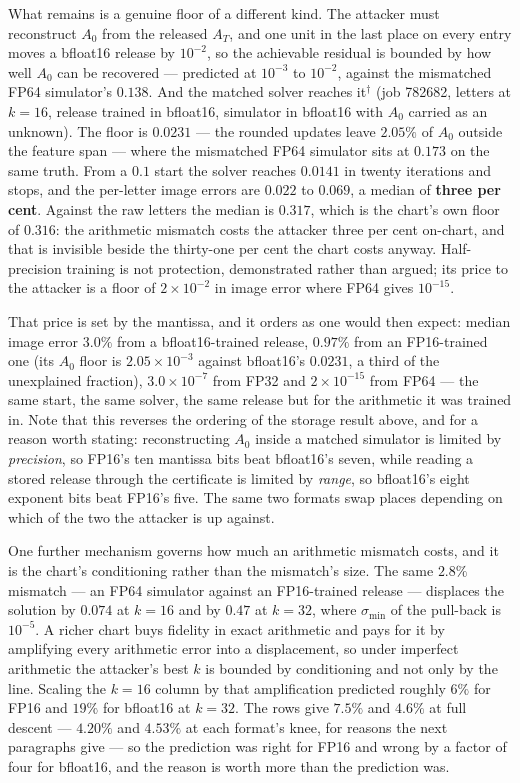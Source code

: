 What remains is a genuine floor of a different kind. The attacker must
reconstruct $A_0$ from the released $A_T$, and one unit in the last place on
every entry moves a bfloat16 release by $10^{-2}$, so the achievable residual
is bounded by how well $A_0$ can be recovered --- predicted at $10^{-3}$ to
$10^{-2}$, against the mismatched FP64 simulator's $0.138$. And the matched solver reaches
it$^\dagger$ (job 782682, letters at $k=16$, release trained in bfloat16,
simulator in bfloat16 with $A_0$ carried as an unknown). The floor is
$0.0231$ --- the rounded updates leave $2.05\%$ of $A_0$ outside the feature
span --- where the mismatched FP64 simulator sits at $0.173$ on the same
truth. From a $0.1$ start the solver reaches $0.0141$ in twenty iterations and
stops, and the per-letter image errors are $0.022$ to $0.069$, a median of
\textbf{three per cent}. Against the raw letters the median is $0.317$, which
is the chart's own floor of $0.316$: the arithmetic mismatch costs the
attacker three per cent on-chart, and that is invisible beside the thirty-one
per cent the chart costs anyway. Half-precision training is not protection,
demonstrated rather than argued; its price to the attacker is a floor of
$2\times10^{-2}$ in image error where FP64 gives $10^{-15}$.

That price is set by the mantissa, and it orders as one would then expect:
median image error $3.0\%$ from a bfloat16-trained release, $0.97\%$ from an
FP16-trained one (its $A_0$ floor is $2.05\times10^{-3}$ against bfloat16's
$0.0231$, a third of the unexplained fraction), $3.0\times10^{-7}$ from FP32
and $2\times10^{-15}$ from FP64 --- the same start, the same solver, the same
release but for the arithmetic it was trained in. Note that this reverses the ordering of the storage
result above, and for a reason worth stating: reconstructing $A_0$ inside a
matched simulator is limited by \emph{precision}, so FP16's ten mantissa bits
beat bfloat16's seven, while reading a stored release through the certificate
is limited by \emph{range}, so bfloat16's eight exponent bits beat FP16's
five. The same two formats swap places depending on which of the two the
attacker is up against.

One further mechanism governs how much an arithmetic mismatch costs, and it is
the chart's conditioning rather than the mismatch's size. The same $2.8\%$
mismatch --- an FP64 simulator against an FP16-trained release --- displaces
the solution by $0.074$ at $k=16$ and by $0.47$ at $k=32$, where
$\sigma_{\min}$ of the pull-back is $10^{-5}$. A richer chart buys fidelity in
exact arithmetic and pays for it by amplifying every arithmetic error into a
displacement, so under imperfect arithmetic the attacker's best $k$ is bounded
by conditioning and not only by the line. Scaling the $k=16$ column by that amplification
predicted roughly $6\%$ for FP16 and $19\%$ for bfloat16 at $k=32$. The rows
give $7.5\%$ and $4.6\%$ at full descent --- $4.20\%$ and $4.53\%$ at each
format's knee, for reasons the next paragraphs give --- so the prediction was
right for FP16 and wrong by a factor of four for bfloat16, and the reason is
worth more than the prediction was.

